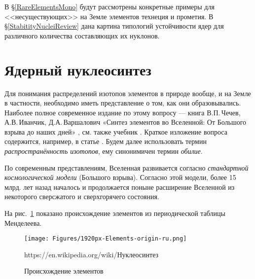 \documentclass[a5paper,openany]{book}
\begin{document}
В \S\ref{RareElementsMono}	будут рассмотрены конкретные примеры для <<несуществующих>> на Земле элементов технеция и прометия.
В \S\ref{StabitityNucleiReview} дана картина типологий устойчивости ядер для различного количества составляющих их нуклонов.
	
	\section{Ядерный нуклеосинтез} \label{Nucleosynthesis}
	
	Для понимания распределений изотопов элементов в природе вообще, и на Земле в частности, необходимо иметь представление о том, как они образовывались. Наиболее  полное современное издание по этому вопросу --- книга   В.П.\,Чечев, А.В.\,Иванчик, Д.А.\,Варшалович «Синтез элементов во Вселенной: От Большого взрыва до наших дней» \cite{Nucleosynthesis}, см. также учебник \cite{MSU98}. Краткое изложение вопроса содержится, например, в статье \cite{ElementsOrigin}. Будем далее использовать термин  \emph{распространённость изотопов}, ему синонимичен термин \emph{обилие}.
	
	По современным представлениям, Вселенная развивается согласно \emph{стандартной космологической модели} (Большого взрыва). Согласно этой модели, более 15 млрд. лет назад началось и продолжается поныне расширение Вселенной из некоторого сверсжатого и сверхгорячего состояния. 

На рис.~\ref{f:Nucleosynthesis_periodic_table} показано происхождение элементов из периодической таблицы Менделеева.
	\begin{figure}[ht] 
	\centering\small
	\texttt{[image: Figures/1920px-Elements-origin-ru.png]}
	\caption{Происхождение элементов} https://en.wikipedia.org/wiki/Нуклеосинтез 
	\label{f:Nucleosynthesis_periodic_table}
\end{figure}
\end{document}
